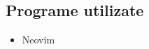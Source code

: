 \vspace{2cm}
\begin{center}
	\section{Programe utilizate}
\end{center}
\vspace{0.5cm}

\begin{itemize}
	\item Neovim
\end{itemize}
